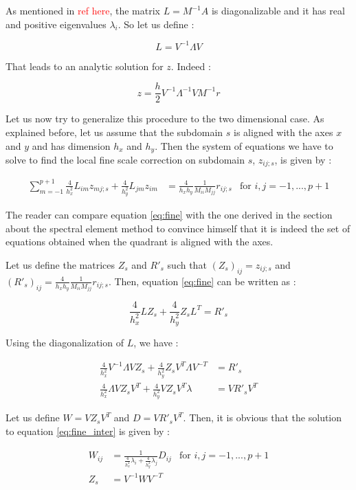 As mentioned in \textcolor{red}{ref here}, the matrix $L = M^{-1}A$ is diagonalizable and it has real and positive eigenvalues $\lambda_i$. So let us define : 

$$ L = V^{-1}\Lambda V$$

That leads to an analytic solution for $z$. Indeed : 

$$ z = \frac{h}{2} V^{-1}\Lambda^{-1}V M^{-1}r$$

Let us now try to generalize this procedure to the two dimensional case. As explained before, let us assume that the subdomain $s$ is aligned with the axes $x$ and $y$ and has dimension $h_x$ and $h_y$. Then the system of equations we have to solve to find the local fine scale correction on subdomain $s$, $z_{ij;s}$, is given by : 

\begin{align}
\sum_{m=-1}^{p+1} \frac{4}{h_x^2}L_{im}z_{mj;s} + \frac{4}{h_y^2} L_{jm}z_{im} &= \frac{4}{h_xh_y}\frac{1}{M_{ii}M_{jj}} r_{ij;s}  &\text{for $i,j=-1,...,p+1$} \label{eq:fine}
\end{align}

The reader can compare equation \ref{eq:fine} with the one derived in the section about the spectral element method to convince himself that it is indeed the set of equations obtained when the quadrant is aligned with the axes. 

Let us define the matrices $Z_s$ and $R'_s$  such that $(Z_s)_{ij} = z_{ij;s}$ and $(R'_s)_{ij} = \frac{4}{h_xh_y}\frac{1}{M_{ii}M_{jj}} r_{ij;s}$. Then, equation \ref{eq:fine} can be written as :

$$\frac{4}{h_x^2} LZ_s + \frac{4}{h_y^2} Z_sL^T = R'_s$$

Using the diagonalization of $L$, we have :

\begin{align}
\frac{4}{h_x^2} V^{-1}\Lambda V Z_s + \frac{4}{h_y^2} Z_s V^T\Lambda V^{-T} &= R'_s \nonumber \\
\frac{4}{h_x^2} \Lambda VZ_sV^T + \frac{4}{h_y^2} VZ_sV^T \lambda &= VR'_sV^T \label{eq:fine_inter}
\end{align}

Let us define $W = VZ_sV^T$ and $D=VR'_sV^T$. Then, it is obvious that the solution to equation \ref{eq:fine_inter} is given by : 

\begin{align*}
W_{ij} &= \frac{1}{\frac{4}{h_x^2}\lambda_i + \frac{4}{h_y^2}\lambda_j}D_{ij} &\text{for $i,j=-1,...,p+1$}\\
Z_s &= V^{-1}WV^{-T}
\end{align*}

